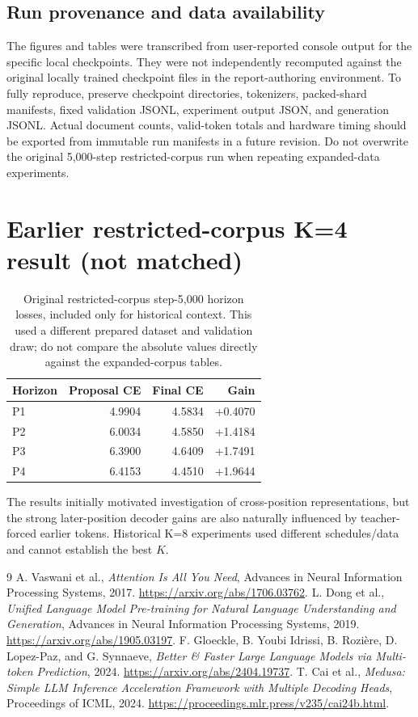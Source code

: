 \documentclass[11pt,letterpaper]{article}
\begin{document}
\subsection{Run provenance and data availability}
The figures and tables were transcribed from user-reported console output for the specific local checkpoints. They were not independently recomputed against the original locally trained checkpoint files in the report-authoring environment. To fully reproduce, preserve checkpoint directories, tokenizers, packed-shard manifests, fixed validation JSONL, experiment output JSON, and generation JSONL. Actual document counts, valid-token totals and hardware timing should be exported from immutable run manifests in a future revision. Do not overwrite the original 5,000-step restricted-corpus run when repeating expanded-data experiments.

\section{Earlier restricted-corpus K=4 result (not matched)}
\begin{table}[ht]
\centering
\caption{Original restricted-corpus step-5,000 horizon losses, included only for historical context. This used a different prepared dataset and validation draw; do not compare the absolute values directly against the expanded-corpus tables.}
\begin{tabular}{@{}lrrr@{}}\toprule
Horizon & Proposal CE & Final CE & Gain\\\midrule
P1 & 4.9904 & 4.5834 & +0.4070\\
P2 & 6.0034 & 4.5850 & +1.4184\\
P3 & 6.3900 & 4.6409 & +1.7491\\
P4 & 6.4153 & 4.4510 & +1.9644\\\bottomrule
\end{tabular}
\end{table}
The results initially motivated investigation of cross-position representations, but the strong later-position decoder gains are also naturally influenced by teacher-forced earlier tokens. Historical K=8 experiments used different schedules/data and cannot establish the best $K$.

\begin{thebibliography}{9}
 A. Vaswani et al., \emph{Attention Is All You Need}, Advances in Neural Information Processing Systems, 2017. \url{https://arxiv.org/abs/1706.03762}.
 L. Dong et al., \emph{Unified Language Model Pre-training for Natural Language Understanding and Generation}, Advances in Neural Information Processing Systems, 2019. \url{https://arxiv.org/abs/1905.03197}.
 F. Gloeckle, B. Youbi Idrissi, B. Rozi\`ere, D. Lopez-Paz, and G. Synnaeve, \emph{Better \& Faster Large Language Models via Multi-token Prediction}, 2024. \url{https://arxiv.org/abs/2404.19737}.
 T. Cai et al., \emph{Medusa: Simple LLM Inference Acceleration Framework with Multiple Decoding Heads}, Proceedings of ICML, 2024. \url{https://proceedings.mlr.press/v235/cai24b.html}.
\end{thebibliography}
\end{document}
